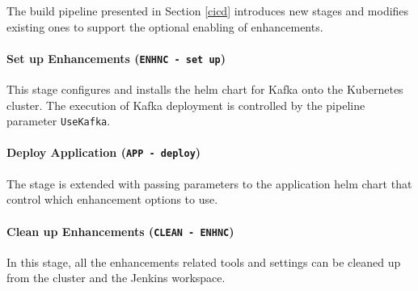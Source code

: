 The build pipeline presented in Section \ref{cicd} introduces new stages and modifies existing ones to support the optional enabling of enhancements.

\paragraph{Set up Enhancements (\texttt{ENHNC - set up})} This stage configures and installs the helm chart for Kafka onto the Kubernetes cluster. The execution of Kafka deployment is controlled by the pipeline parameter \texttt{UseKafka}.

\paragraph{Deploy Application (\texttt{APP - deploy})} The stage is extended with passing parameters to the application helm chart that control which enhancement options to use. 

\paragraph{Clean up Enhancements (\texttt{CLEAN - ENHNC})} In this stage, all the enhancements related tools and settings can be cleaned up from the cluster and the Jenkins workspace.




